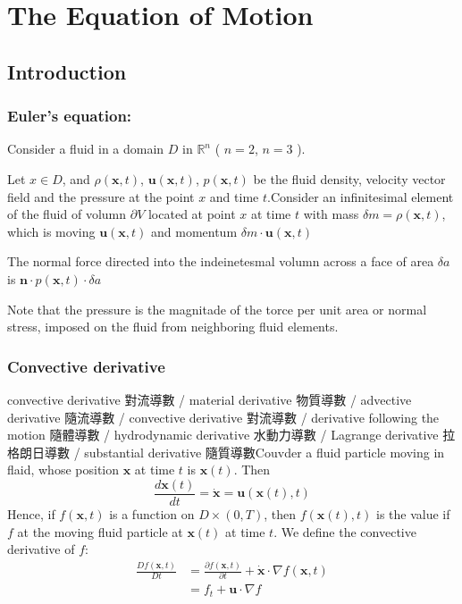 \section{The Equation of Motion} %

\subsection{Introduction} %

\subsubsection{Euler's equation:} %

Consider a fluid in a domain $D$ in $\mathbb{R}^{n}$  ( $n=2$, $n=3$ ).

Let $x\in D$, and $\rho(\textbf{x},t)$, $\textbf{u}(\textbf{x},t)$, $p(\textbf{x},t)$ be the fluid density, velocity vector field and the pressure at the point $x$ and time $t$.Consider an infinitesimal element of the fluid of volumn $\partial V$ located at point $x$ at time $t$ with mass $\delta m = \rho(\textbf{x},t)$, which is moving $\textbf{u}(\textbf{x},t)$ and momentum $\delta m \cdot \textbf{u}(\textbf{x},t)$

The normal force directed into the indeinetesmal volumn across a face of area $\delta a$ is $\textbf{n}\cdot p(\textbf{x},t)\cdot \delta a$

\begin{center}\end{center}

Note that the pressure is the magnitade of the torce per unit area or normal stress, imposed on the fluid from neighboring fluid elements.

\subsubsection{Convective derivative} %
convective derivative 對流導數 / material derivative 物質導數 / advective derivative 隨流導數 / convective derivative 對流導數 / derivative following the motion 隨體導數 / hydrodynamic derivative 水動力導數 / Lagrange derivative 拉格朗日導數 / substantial derivative 隨質導數Couvder a fluid particle moving in flaid, whose position $\textbf{x}$ at time $t$ is $\textbf{x}(t)$. Then 
\begin{equation}
\frac{d\textbf{x}(t)}{dt} = \dot{\textbf{x}} = \textbf{u}(\textbf{x}(t),t)
\end{equation}
Hence, if $f(\textbf{x},t)$ is a function on $D\times (0,T)$, then $f(\textbf{x}(t), t)$ is the value if $f$ at the moving fluid particle at $\textbf{x}(t)$ at time $t$. We define the convective derivative of $f$:
\begin{equation}
\begin{aligned}
\frac{Df(\textbf{x},t)}{Dt} &= \frac{\partial f(\textbf{x},t)}{\partial t} + \dot{\textbf{x}} \cdot \nabla f(\textbf{x},t)\\
&= f_t + \textbf{u}\cdot \nabla f
\end{aligned}
\end{equation}


